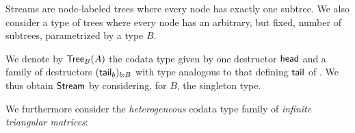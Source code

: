 \documentclass[a4paper,USenglish]{lipics}
\begin{document}
\begin{Long}

Streams are node-labeled trees where every node has exactly one subtree.
We also consider a type of trees where every node has an arbitrary, but fixed, number of subtrees, 
parametrized by a type $B$.



\begin{ex}\label{ex_trees}
 We denote by $\mathsf{Tree}_B(A)$ the codata type given by one destructor $\mathsf{head}$ and a family of 
 destructors $(\mathsf{tail}_b)_{b:B}$ with type analogous to that defining $\mathsf{tail}$ of .
 We thus obtain $\mathsf{Stream}$ by considering, for $B$, the singleton type.
\end{ex}

\end{Long}

We furthermore consider the \emph{heterogeneous} codata type family of \emph{infinite triangular matrices}:
\end{document}
